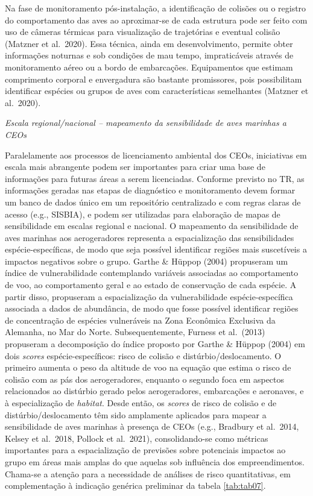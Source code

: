 \documentclass[
  oneside]{scrbook}
\begin{document}
Na fase de monitoramento pós-instalação, a identificação de colisões ou o registro do comportamento das aves ao aproximar-se de cada estrutura pode ser feito com uso de câmeras térmicas para visualização de trajetórias e eventual colisão (Matzner et al.~2020). Essa técnica, ainda em desenvolvimento, permite obter informações noturnas e sob condições de mau tempo, impraticáveis através de monitoramento aéreo ou a bordo de embarcações. Equipamentos que estimam comprimento corporal e envergadura são bastante promissores, pois possibilitam identificar espécies ou grupos de aves com características semelhantes (Matzner et al.~2020).

\emph{Escala regional/nacional -- mapeamento da sensibilidade de aves marinhas a CEOs}

Paralelamente aos processos de licenciamento ambiental dos CEOs, iniciativas em escala mais abrangente podem ser importantes para criar uma base de informações para futuras áreas a serem licenciadas. Conforme previsto no TR, as informações geradas nas etapas de diagnóstico e monitoramento devem formar um banco de dados único em um repositório centralizado e com regras claras de acesso (e.g., SISBIA), e podem ser utilizadas para elaboração de mapas de sensibilidade em escalas regional e nacional. O mapeamento da sensibilidade de aves marinhas aos aerogeradores representa a espacialização das sensibilidades espécie-específicas, de modo que seja possível identificar regiões mais suscetíveis a impactos negativos sobre o grupo. Garthe \& Hüppop (2004) propuseram um índice de vulnerabilidade contemplando variáveis associadas ao comportamento de voo, ao comportamento geral e ao estado de conservação de cada espécie. A partir disso, propuseram a espacialização da vulnerabilidade espécie-específica associada a dados de abundância, de modo que fosse possível identificar regiões de concentração de espécies vulneráveis na Zona Econômica Exclusiva da Alemanha, no Mar do Norte. Subsequentemente, Furness et al.~(2013) propuseram a decomposição do índice proposto por Garthe \& Hüppop (2004) em dois \emph{scores} espécie-específicos: risco de colisão e distúrbio/deslocamento. O primeiro aumenta o peso da altitude de voo na equação que estima o risco de colisão com as pás dos aerogeradores, enquanto o segundo foca em aspectos relacionados ao distúrbio gerado pelos aerogeradores, embarcações e aeronaves, e à especialização de \emph{habitat}. Desde então, os \emph{scores} de risco de colisão e de distúrbio/deslocamento têm sido amplamente aplicados para mapear a sensibilidade de aves marinhas à presença de CEOs (e.g., Bradbury et al.~2014, Kelsey et al.~2018, Pollock et al.~2021), consolidando-se como métricas importantes para a espacialização de previsões sobre potenciais impactos ao grupo em áreas mais amplas do que aquelas sob influência dos empreendimentos. Chama-se a atenção para a necessidade de análises de risco quantitativas, em complementação à indicação genérica preliminar da tabela \ref{tab:tab07}.
\end{document}
